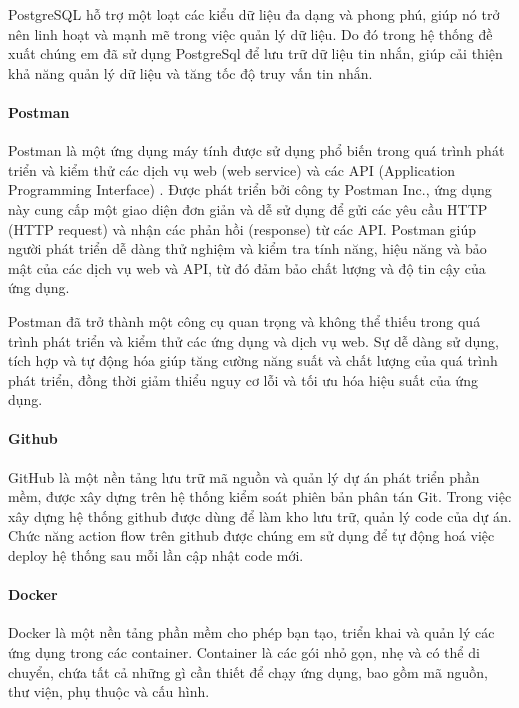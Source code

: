 PostgreSQL hỗ trợ một loạt các kiểu dữ liệu đa dạng và phong phú, giúp nó trở nên linh hoạt và mạnh mẽ trong việc quản lý dữ liệu. Do đó trong hệ thống đề xuất chúng em đã sử dụng PostgreSql để lưu trữ dữ liệu tin nhắn, giúp cải thiện khả năng quản lý dữ liệu và tăng tốc độ truy vấn tin nhắn.
\paragraph{Postman}
\mbox{}

Postman là một ứng dụng máy tính được sử dụng phổ biến trong quá trình phát triển và kiểm thử các dịch vụ web (web service) và các API (Application Programming Interface) \cite{postman_1}. Được phát triển bởi công ty Postman Inc., ứng dụng này cung cấp một giao diện đơn giản và dễ sử dụng để gửi các yêu cầu HTTP (HTTP request) và nhận các phản hồi (response) từ các API. Postman giúp người phát triển dễ dàng thử nghiệm và kiểm tra tính năng, hiệu năng và bảo mật của các dịch vụ web và API, từ đó đảm bảo chất lượng và độ tin cậy của ứng dụng.

Postman đã trở thành một công cụ quan trọng và không thể thiếu trong quá trình phát triển và kiểm thử các ứng dụng và dịch vụ web. Sự dễ dàng sử dụng, tích hợp và tự động hóa giúp tăng cường năng suất và chất lượng của quá trình phát triển, đồng thời giảm thiểu nguy cơ lỗi và tối ưu hóa hiệu suất của ứng dụng.

\paragraph{Github}
\mbox{}

GitHub là một nền tảng lưu trữ mã nguồn và quản lý dự án phát triển phần mềm, được xây dựng trên hệ thống kiểm soát phiên bản phân tán Git. Trong việc xây dựng hệ thống github được dùng để làm kho lưu trữ, quản lý code của dự án. Chức năng action flow trên github được chúng em sử dụng để tự động hoá việc deploy hệ thống sau mỗi lần cập nhật code mới.

\paragraph{Docker}
\mbox{}

Docker là một nền tảng phần mềm cho phép bạn tạo, triển khai và quản lý các ứng dụng trong các container. Container là các gói nhỏ gọn, nhẹ và có thể di chuyển, chứa tất cả những gì cần thiết để chạy ứng dụng, bao gồm mã nguồn, thư viện, phụ thuộc và cấu hình.

